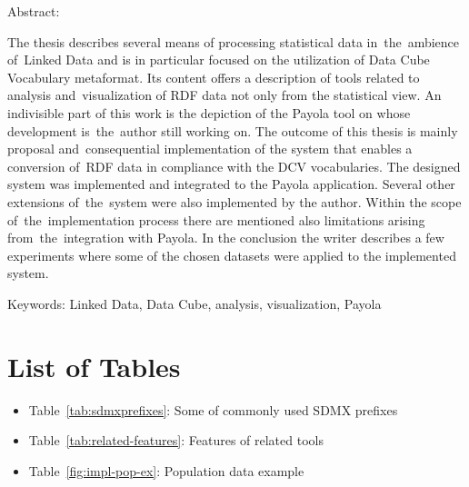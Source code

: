 \documentclass[12pt,a4paper]{report}
\let\openright=\clearpage
\def\chapwithtoc#1{
\chapter*{#1}
\addcontentsline{toc}{chapter}{#1}
}
\begin{document}
{Abstract:
\begin{sloppypar}
The thesis describes several means of processing statistical data in~the~ambience of~Linked Data
and is in particular focused on the utilization of Data Cube Vocabulary metaformat.
Its content offers a description of tools related to analysis and~visualization of RDF
data not only from the statistical view. An indivisible part of this work is the depiction of
the Payola tool on whose development is~the~author still working on. The outcome of this
thesis is mainly proposal and~consequential implementation of the system that enables
a conversion of~RDF data in compliance with the DCV vocabularies. The designed system
was implemented and integrated to the Payola application. Several other extensions
of~the~system were also implemented by the author. Within the scope of~the~implementation
process there are mentioned also limitations arising from~the~integration with Payola.
In the conclusion the writer describes a few experiments where some of the chosen
datasets were applied to the implemented system.
\end{sloppypar}

Keywords:
Linked Data, Data Cube, analysis, visualization, Payola

\vss}

\newpage


\openright
\pagestyle{plain}
\setcounter{page}{1}
\tableofcontents










% 





\chapwithtoc{List of Tables}
\begin{itemize}
\item Table~\ref{tab:sdmxprefixes}:  Some of commonly used SDMX prefixes
\item Table~\ref{tab:related-features}:  Features of related tools
\item Table~\ref{fig:impl-pop-ex}:  Population data example
\end{itemize}
\end{document}
